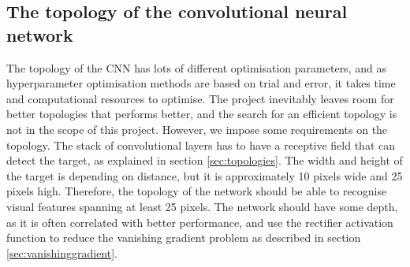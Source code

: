 \subsection{The topology of the convolutional neural network}
The topology of the CNN has lots of different optimisation parameters, and as hyperparameter optimisation methods are based on trial and error, it takes time and computational resources to optimise. The project inevitably leaves room for better topologies that performs better, and the search for an efficient topology is not in the scope of this project. However, we impose some requirements on the topology. The stack of convolutional layers has to have a receptive field that can detect the target, as explained in section \ref{sec:topologies}. The width and height of the target is depending on distance, but it is approximately 10 pixels wide and 25 pixels high. Therefore, the topology of the network should be able to recognise visual features spanning at least 25 pixels. The network should have some depth, as it is often correlated with better performance\cite{christian}\cite{karen}, and use the rectifier activation function to reduce the vanishing gradient problem as described in section \ref{sec:vanishinggradient}.





































